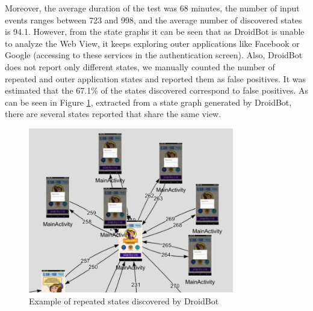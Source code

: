 Moreover, the average duration of the test was 68 minutes, the number of input events ranges between 723 and 998, and the average number of discovered states is 94.1. However, from the state graphs it can be seen that as DroidBot is unable to analyze the Web View, it keeps exploring outer applications like Facebook or Google (accessing to these services in the authentication screen). Also, DroidBot does not report only different states, we manually counted the number of repeated and outer application states and reported them as false positives. It was estimated that the 67.1\% of the states discovered correspond to false positives. As can be seen in Figure \ref{repeated}, extracted from a state graph generated by DroidBot, there are several states reported that share the same view.

\begin{figure}[t]
	\centering
	\includegraphics[width=0.8\textwidth]{img/exRepeated.png}
	\caption{Example of repeated states discovered by DroidBot}
	
	\label{repeated}
\end{figure} 

